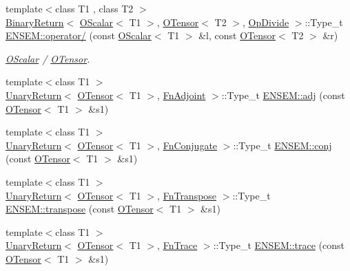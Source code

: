 \begin{DoxyCompactItemize}
{\footnotesize template$<$class T1 , class T2 $>$ }\\\mbox{\hyperlink{structENSEM_1_1BinaryReturn}{Binary\+Return}}$<$ \mbox{\hyperlink{classENSEM_1_1OScalar}{O\+Scalar}}$<$ T1 $>$, \mbox{\hyperlink{classENSEM_1_1OTensor}{O\+Tensor}}$<$ T2 $>$, \mbox{\hyperlink{structENSEM_1_1OpDivide}{Op\+Divide}} $>$\+::Type\+\_\+t \mbox{\hyperlink{group__obstensor_ga7a165136688ba38f4500951758f372d3}{E\+N\+S\+E\+M\+::operator/}} (const \mbox{\hyperlink{classENSEM_1_1OScalar}{O\+Scalar}}$<$ T1 $>$ \&l, const \mbox{\hyperlink{classENSEM_1_1OTensor}{O\+Tensor}}$<$ T2 $>$ \&r)
\begin{DoxyCompactList}\small\item\em \mbox{\hyperlink{classENSEM_1_1OScalar}{O\+Scalar}} / \mbox{\hyperlink{classENSEM_1_1OTensor}{O\+Tensor}}. \end{DoxyCompactList}\item 
{\footnotesize template$<$class T1 $>$ }\\\mbox{\hyperlink{structENSEM_1_1UnaryReturn}{Unary\+Return}}$<$ \mbox{\hyperlink{classENSEM_1_1OTensor}{O\+Tensor}}$<$ T1 $>$, \mbox{\hyperlink{structENSEM_1_1FnAdjoint}{Fn\+Adjoint}} $>$\+::Type\+\_\+t \mbox{\hyperlink{group__obstensor_ga3c5e5939e51cda2594e94fd03c07ab8b}{E\+N\+S\+E\+M\+::adj}} (const \mbox{\hyperlink{classENSEM_1_1OTensor}{O\+Tensor}}$<$ T1 $>$ \&s1)
\item 
{\footnotesize template$<$class T1 $>$ }\\\mbox{\hyperlink{structENSEM_1_1UnaryReturn}{Unary\+Return}}$<$ \mbox{\hyperlink{classENSEM_1_1OTensor}{O\+Tensor}}$<$ T1 $>$, \mbox{\hyperlink{structENSEM_1_1FnConjugate}{Fn\+Conjugate}} $>$\+::Type\+\_\+t \mbox{\hyperlink{group__obstensor_ga53d2641f95a433640eadd4ab33fed1ba}{E\+N\+S\+E\+M\+::conj}} (const \mbox{\hyperlink{classENSEM_1_1OTensor}{O\+Tensor}}$<$ T1 $>$ \&s1)
\item 
{\footnotesize template$<$class T1 $>$ }\\\mbox{\hyperlink{structENSEM_1_1UnaryReturn}{Unary\+Return}}$<$ \mbox{\hyperlink{classENSEM_1_1OTensor}{O\+Tensor}}$<$ T1 $>$, \mbox{\hyperlink{structENSEM_1_1FnTranspose}{Fn\+Transpose}} $>$\+::Type\+\_\+t \mbox{\hyperlink{group__obstensor_gad9570a0a6a341ca0e3c9a3f77fd33c3c}{E\+N\+S\+E\+M\+::transpose}} (const \mbox{\hyperlink{classENSEM_1_1OTensor}{O\+Tensor}}$<$ T1 $>$ \&s1)
\item 
{\footnotesize template$<$class T1 $>$ }\\\mbox{\hyperlink{structENSEM_1_1UnaryReturn}{Unary\+Return}}$<$ \mbox{\hyperlink{classENSEM_1_1OTensor}{O\+Tensor}}$<$ T1 $>$, \mbox{\hyperlink{structENSEM_1_1FnTrace}{Fn\+Trace}} $>$\+::Type\+\_\+t \mbox{\hyperlink{group__obstensor_gade63bf28037560bb8bb80db95b64eacf}{E\+N\+S\+E\+M\+::trace}} (const \mbox{\hyperlink{classENSEM_1_1OTensor}{O\+Tensor}}$<$ T1 $>$ \&s1)

\end{DoxyCompactItemize}
